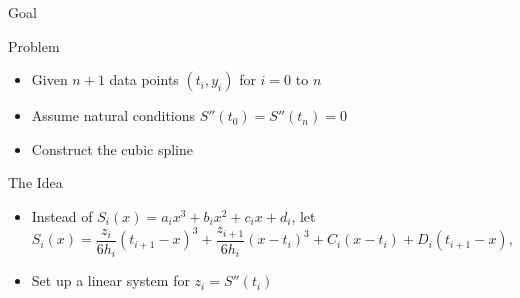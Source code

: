 \documentclass[10pt]{beamer}
\begin{document}

    


\begin{frame}{Goal}

\begin{block}{Problem}
\begin{itemize}
    \item Given $n+1$ data points $(t_i, y_i)$ for $i=0$ to $n$
    \item Assume natural conditions $S''(t_0) = S''(t_n)=0$
    \item Construct the cubic spline 
\end{itemize}
\end{block}

\begin{block}{The Idea}
    \begin{itemize}
\item Instead of $S_i(x)= a_ix^3 + b_ix^2 + c_ix + d_i$, let 
    \begin{equation*}
      S_i(x) = \frac{z_i}{6h_i}(t_{i+1}-x)^3 +\frac{z_{i+1}}{6h_i}(x-t_i)^3 + C_i(x-t_i) + D_i(t_{i+1}-x),
    \end{equation*}

\item Set up a linear system for $z_i=S''(t_i)$
\end{itemize}
\end{block}
    
\end{frame}
\end{document}
